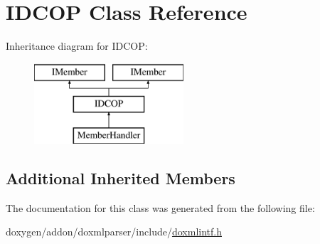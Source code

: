 \hypertarget{class_i_d_c_o_p}{}\section{I\+D\+C\+OP Class Reference}
\label{class_i_d_c_o_p}
Inheritance diagram for I\+D\+C\+OP\+:\begin{figure}[H]
\begin{center}
\leavevmode
\includegraphics[height=3.000000cm]{class_i_d_c_o_p}
\end{center}
\end{figure}
\subsection*{Additional Inherited Members}


The documentation for this class was generated from the following file\+:\begin{DoxyCompactItemize}
\item 
doxygen/addon/doxmlparser/include/\mbox{\hyperlink{include_2doxmlintf_8h}{doxmlintf.\+h}}\end{DoxyCompactItemize}

